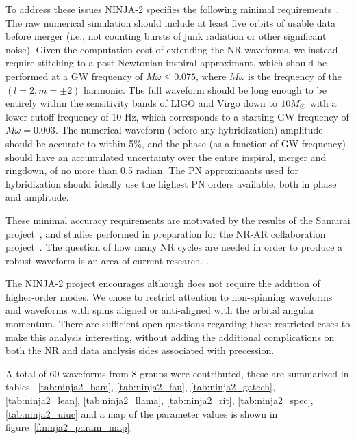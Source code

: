 To address these issues NINJA-2 specifies the following minimal
requirements~\cite{ninja2-wiki}.  The raw numerical simulation should
include at least five orbits of usable data before merger (i.e., not
counting bursts of junk radiation or other significant noise).  Given
the computation cost of extending the NR waveforms, we instead require
stitching to a post-Newtonian inspiral approximant, which should be
performed at a GW frequency of $M\omega ≤ 0.075$, where $M\omega$ is
the frequency of the $(l = 2, m = \pm 2)$ harmonic. The full waveform
should be long enough to be entirely within the sensitivity bands of
LIGO and Virgo down to $10 M_\odot$ with a lower cutoff frequency of 10
Hz, which corresponds to a starting GW frequency of $M\omega = 0.003$.
The numerical-waveform (before any hybridization) amplitude should be
accurate to within 5\%, and the phase (as a function of GW frequency)
should have an accumulated uncertainty over the entire inspiral,
merger and ringdown, of no more than 0.5 radian. The PN approximants
used for hybridization should ideally use the highest PN orders
available, both in phase and amplitude.  

These minimal accuracy requirements are motivated by the results of
the Samurai project~\cite{Hannam:2009hh}, and studies performed in
preparation for the NR-AR collaboration project~\cite{ninja-wiki}.
The question of how many NR cycles are needed in order to produce a
robust waveform is an area of current research. .

The NINJA-2 project encourages although does not require the addition
of higher-order modes.  We chose to restrict attention to non-spinning
waveforms and waveforms with spins aligned or anti-aligned with the
orbital angular momentum.  There are sufficient open questions
regarding these restricted cases to make this analysis interesting,
without adding the additional complications on both the NR and data
analysis sides associated with precession. 

A total of 60 waveforms from 8 groups were contributed, these are
summarized in tables ~\ref{tab:ninja2_bam}, \ref{tab:ninja2_fau},
\ref{tab:ninja2_gatech}, \ref{tab:ninja2_lean},
\ref{tab:ninja2_llama}, \ref{tab:ninja2_rit}, \ref{tab:ninja2_spec},
\ref{tab:ninja2_uiuc} and a map of the parameter values is shown in
figure~\ref{f:ninja2_param_map}.

